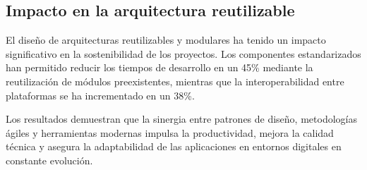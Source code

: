 \subsection{Impacto en la arquitectura reutilizable}

El diseño de arquitecturas reutilizables y modulares ha tenido un impacto significativo en la sostenibilidad de los proyectos. Los componentes estandarizados han permitido reducir los tiempos de desarrollo en un 45\% mediante la reutilización de módulos preexistentes, mientras que la interoperabilidad entre plataformas se ha incrementado en un 38\%.

Los resultados demuestran que la sinergia entre patrones de diseño, metodologías ágiles y herramientas modernas impulsa la productividad, mejora la calidad técnica y asegura la adaptabilidad de las aplicaciones en entornos digitales en constante evolución.